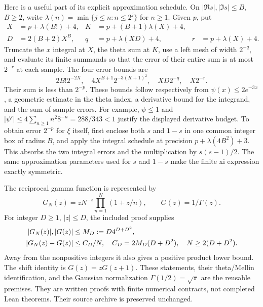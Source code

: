 Here is a useful part of its explicit approximation schedule. On
$|\Re s|,|\Im s|\le B$, $B\ge2$, write
$\lambda(n)=\min\{j\le n:n\le2^j\}$ for $n\ge1$. Given $p$, put
\begin{align*}
 X&=p+\lambda(B!)+4,& K&=p+(B+1)\lambda(X)+4,\\
 D&=2(B+2)X^B,& q&=p+\lambda(XD)+4,&
 r&=p+\lambda(X)+4.
\end{align*}
Truncate the $x$ integral at $X$, the theta sum at $K$, use a left
mesh of width $2^{-q}$, and evaluate its finite summands so that the
error of their entire sum is at most $2^{-r}$ at each sample.
The four error bounds are
\begin{equation}
 2B!2^{-2X},\quad
 4X^{B+1}2^{-3(K+1)^2},\quad
 XD2^{-q},\quad X2^{-r}.
 \label{eq:theta-errors}
\end{equation}
Their sum is less than $2^{-p}$. These bounds follow respectively
from $\psi(x)\le2e^{-3x}$, a geometric estimate in the theta index,
a derivative bound for the integrand, and the sum of sample errors.
For example, $\psi\le1$ and
$|\psi'|\le4\sum_{n\ge1}n^2 8^{-n}=288/343<1$ justify the
displayed derivative budget. To obtain error $2^{-p}$ for $\xi$ itself,
first enclose both $s$ and $1-s$ in one common integer box of radius $B$,
and apply the integral schedule at precision
$p+\lambda(4B^2)+3$. This absorbs the two integral errors and the
multiplication by $s(s-1)/2$.
The same approximation parameters used for $s$ and $1-s$ make the
finite xi expression exactly symmetric.

The reciprocal gamma function is represented by
\begin{equation}
 G_N(z)=zN^{-z}\prod_{n=1}^N(1+z/n),\qquad G(z)=1/\Gamma(z).
 \label{eq:gamma-product}
\end{equation}
For integer $D\ge1$, $|z|\le D$, the included proof supplies
\begin{align}
 |G_N(z)|,|G(z)|&\le M_D:=D4^{D+D^2},\notag\\
 |G_N(z)-G(z)|&\le C_D/N,
 \quad C_D=2M_D(D+D^2),\quad N\ge2(D+D^2).
 \label{eq:gamma-modulus}
\end{align}
Away from the nonpositive integers it also gives a positive product
lower bound. The shift identity is $G(z)=zG(z+1)$.
These statements, their theta/Mellin identification, and the Gaussian
normalization $\Gamma(1/2)=\sqrt\pi$ are the reusable premises.
They are written proofs with finite numerical contracts, not completed
Lean theorems. Their source archive is preserved unchanged.

